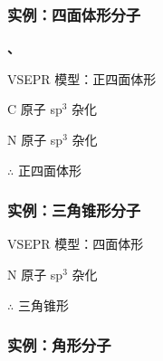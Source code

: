         \subsubsection{实例：四面体形分子}\label{subsubsec:四面体形分子}

            \noindent\begin{minipage}[t]{0.48\textwidth}
                \noindent\textbf{、}
                
                VSEPR 模型：正四面体形
                
                C 原子 sp$^3$ 杂化
            \end{minipage}
            \hfill
            \begin{minipage}[t]{0.48\textwidth}
                \noindent\textbf{}
                
                N 原子 sp$^3$ 杂化
                
                \(\therefore\)  正四面体形
            \end{minipage}

        \subsubsection{实例：三角锥形分子}\label{subsubsec:三角锥形分子}

            \noindent\textbf{}

            \noindent VSEPR 模型：四面体形

            \noindent N 原子 sp$^3$ 杂化

            \noindent \(\therefore\)  三角锥形

        \subsubsection{实例：角形分子}\label{subsubsec:角形分子}

